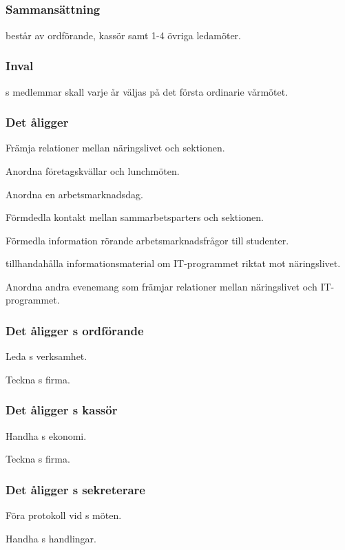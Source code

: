\subsection{\ARMITFULL{}}
\subsubsection{Sammansättning}
\ARMIT{} består av ordförande, kassör samt 1-4 övriga ledamöter.

\subsubsection{Inval}
\ARMIT{}s medlemmar skall varje år väljas på det första ordinarie vårmötet.

\subsubsection{Det åligger \ARMIT{}}
\begin{att}
	\item Främja relationer mellan näringslivet och sektionen.
	\item Anordna företagskvällar och lunchmöten.
	\item Anordna en arbetsmarknadsdag.
	\item Förmdedla kontakt mellan sammarbetsparters och sektionen.
	\item Förmedla information rörande arbetsmarknadsfrågor till studenter.
	\item tillhandahålla informationsmaterial om IT-programmet riktat mot näringslivet.
	\item Anordna andra evenemang som främjar relationer mellan näringslivet och IT-programmet.
\end{att}

\subsubsection{Det åligger \ARMIT{}s ordförande}
\begin{att}
	\item Leda \ARMIT{}s verksamhet.
	\item Teckna \ARMIT{}s firma.
\end{att}

\subsubsection{Det åligger \ARMIT{}s kassör}
\begin{att}
	\item Handha \ARMIT{}s ekonomi.
	\item Teckna \ARMIT{}s firma.
\end{att}

\subsubsection{Det åligger \ARMIT{}s sekreterare}
\begin{att}
	\item Föra protokoll vid \ARMIT{}s möten.
	\item Handha \ARMIT{}s handlingar.
\end{att}